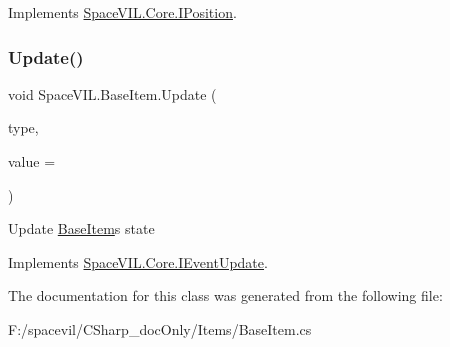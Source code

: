 Implements \mbox{\hyperlink{interface_space_v_i_l_1_1_core_1_1_i_position}{Space\+V\+I\+L.\+Core.\+I\+Position}}.

\mbox{\label{class_space_v_i_l_1_1_base_item_aec3ac6bb0e7d814b478d89b93f8e3d18}} 
\subsubsection{\texorpdfstring{Update()}{Update()}}
{\footnotesize\ttfamily void Space\+V\+I\+L.\+Base\+Item.\+Update (\begin{DoxyParamCaption}\item[{Geometry\+Event\+Type}]{type,  }\item[{int}]{value = {} }\end{DoxyParamCaption})}



Update \mbox{\hyperlink{class_space_v_i_l_1_1_base_item}{Base\+Item}}\textquotesingle{}s state 



Implements \mbox{\hyperlink{interface_space_v_i_l_1_1_core_1_1_i_event_update}{Space\+V\+I\+L.\+Core.\+I\+Event\+Update}}.



The documentation for this class was generated from the following file\+:\begin{DoxyCompactItemize}
\item 
F\+:/spacevil/\+C\+Sharp\+\_\+doc\+Only/\+Items/Base\+Item.\+cs\end{DoxyCompactItemize}
